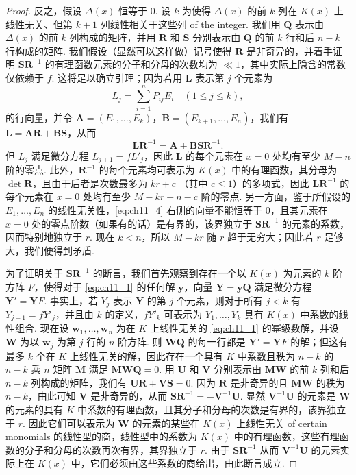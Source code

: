 \begin{proof}
反之，假设 $\Delta(x)$ 恒等于 0. 设 $k$ 为使得 $\Delta(x)$ 的前 $k$ 列在 $K(x)$ 上线性无关、但第 $k+1$ 列线性相关于这些列 of the integer. 我们用 $\mathbf{Q}$ 表示由 $\Delta(x)$ 的前 $k$ 列构成的矩阵，并用 $\mathbf{R}$ 和 $\mathbf{S}$ 分别表示由 $\mathbf{Q}$ 的前 $k$ 行和后 $n-k$ 行构成的矩阵. 我们假设（显然可以这样做）记号使得 $\mathbf{R}$ 是非奇异的，并着手证明 $\mathbf{S}\mathbf{R}^{-1}$ 的有理函数元素的分子和分母的次数均为 $\ll 1$，其中实际上隐含的常数仅依赖于 $f$. 这将足以确立引理；因为若用 $\mathbf{L}$ 表示第 $j$ 个元素为
\[L_{j} = \sum_{i=1}^{n} P_{ij} E_{i} \quad (1 \leq j \leq k),\]
的行向量，并令 $\mathbf{A} = (E_1, \dots, E_k)$，$\mathbf{B} = (E_{k+1}, \dots, E_n)$，我们有 $\mathbf{L} = \mathbf{A}\mathbf{R} + \mathbf{B}\mathbf{S}$，从而
\[\mathbf{L}\mathbf{R}^{-1} = \mathbf{A} + \mathbf{B}\mathbf{S}\mathbf{R}^{-1}. \tag{4}\label{eq:ch11_4}\]
但 $L_j$ 满足微分方程 $L_{j+1} = f L'_j$，因此 $\mathbf{L}$ 的每个元素在 $x=0$ 处均有至少 $M-n$ 阶的零点. 此外，$\mathbf{R}^{-1}$ 的每个元素均可表示为 $K(x)$ 中的有理函数，其分母为 $\det\mathbf{R}$，且由于后者是次数最多为 $kr+c$ （其中 $c \leqslant 1$）的多项式，因此 $\mathbf{L}\mathbf{R}^{-1}$ 的每个元素在 $x=0$ 处均有至少 $M-kr-n-c$ 阶的零点. 另一方面，鉴于所假设的 $E_1, \ldots, E_n$ 的线性无关性，\eqref{eq:ch11_4} 右侧的向量不能恒等于 0，且其元素在 $x=0$ 处的零点阶数（如果有的话）是有界的，该界独立于 $\mathbf{S}\mathbf{R}^{-1}$ 的元素的系数，因而特别地独立于 $r$. 现在 $k < n$，所以 $M-kr$ 随 $r$ 趋于无穷大；因此若 $r$ 足够大，我们便得到矛盾.

为了证明关于 $\mathbf{S}\mathbf{R}^{-1}$ 的断言，我们首先观察到存在一个以 $K(x)$ 为元素的 $k$ 阶方阵 $F$，使得对于 \eqref{eq:ch11_1} 的任何解 $\mathbf{y}$，向量 $\mathbf{Y} = \mathbf{y}\mathbf{Q}$ 满足微分方程 $\mathbf{Y}' = \mathbf{Y}F$. 事实上，若 $Y_j$ 表示 $\mathbf{Y}$ 的第 $j$ 个元素，则对于所有 $j < k$ 有 $Y_{j+1} = f Y'_j$，并且由 $k$ 的定义，$f Y'_k$ 可表示为 $Y_1, \ldots, Y_k$ 具有 $K(x)$ 中系数的线性组合. 现在设 $\mathbf{w}_1, \dots, \mathbf{w}_n$ 为在 $K$ 上线性无关的 \eqref{eq:ch11_1} 的幂级数解，并设 $\mathbf{W}$ 为以 $\mathbf{w}_j$ 为第 $j$ 行的 $n$ 阶方阵. 则 $\mathbf{W}\mathbf{Q}$ 的每一行都是 $\mathbf{Y}' = \mathbf{Y}F$ 的解；但这有最多 $k$ 个在 $K$ 上线性无关的解，因此存在一个具有 $K$ 中系数且秩为 $n-k$ 的 $n-k$ 乘 $n$ 矩阵 $\mathbf{M}$ 满足 $\mathbf{M}\mathbf{W}\mathbf{Q} = 0$. 用 $\mathbf{U}$ 和 $\mathbf{V}$ 分别表示由 $\mathbf{M}\mathbf{W}$ 的前 $k$ 列和后 $n-k$ 列构成的矩阵，我们有 $\mathbf{U}\mathbf{R} + \mathbf{V}\mathbf{S} = 0$. 因为 $\mathbf{R}$ 是非奇异的且 $\mathbf{M}\mathbf{W}$ 的秩为 $n-k$，由此可知 $\mathbf{V}$ 是非奇异的，从而 $\mathbf{S}\mathbf{R}^{-1} = -\mathbf{V}^{-1}\mathbf{U}$. 显然 $\mathbf{V}^{-1}\mathbf{U}$ 的元素是 $\mathbf{W}$ 的元素的具有 $K$ 中系数的有理函数，且其分子和分母的次数是有界的，该界独立于 $r$. 因此它们可以表示为 $\mathbf{W}$ 的元素的某些在 $K(x)$ 上线性无关 of certain monomials 的线性型的商，线性型中的系数为 $K(x)$ 中的有理函数，这些有理函数的分子和分母的次数再次有界，其界独立于 $r$. 由于 $\mathbf{S}\mathbf{R}^{-1}$ 从而 $\mathbf{V}^{-1}\mathbf{U}$ 的元素实际上在 $K(x)$ 中，它们必须由这些系数的商给出，由此断言成立.
\end{proof}

